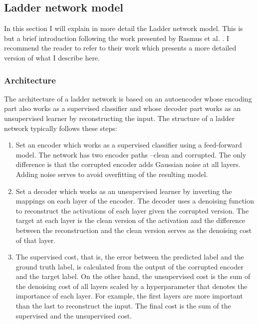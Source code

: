 \subsection{Ladder network model}\label{sec:ladder:model}

In this section I will explain in more detail the Ladder network model. This is
but a brief introduction following the work presented by Rasmus et al.
\cite{Rasmus:2015aa}. I recommend the reader to refer to their work which
presents a more detailed version of what I describe here.

\subsubsection{Architecture}

The architecture of a ladder network is based on an autoencoder whose encoding
part also works as a supervised classifier and whose decoder part works as an
unsupervised learner by reconstructing the input. The structure of a ladder
network typically follows these steps:

\begin{enumerate}
  \item Set an encoder which works as a supervised classifier using a
    feed-forward model. The network has two encoder paths --clean and
    corrupted. The only difference is that the corrupted encoder adds Gaussian
    noise at all layers. Adding noise serves to avoid overfitting of the
    resulting model.
  \item Set a decoder which works as an unsupervised learner by inverting the
    mappings on each layer of the encoder. The decoder uses a denoising
    function to reconstruct the activations of each layer given the corrupted
    version. The target at each layer is the clean version of the activation
    and the difference between the reconstruction and the clean version serves
    as the denoising cost of that layer.
  \item The supervised cost, that is, the error between the predicted label and
    the ground truth label, is calculated from the output of the corrupted
    encoder and the target label. On the other hand, the unsupervised cost is
    the sum of the denoising cost of all layers scaled by a hyperparameter that
    denotes the importance of each layer. For example, the first layers are
    more important than the last to reconstruct the input. The final cost is
    the sum of the supervised and the unsupervised cost. 
\end{enumerate}

